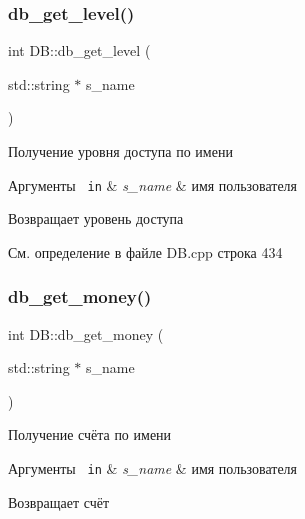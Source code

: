 \mbox{\label{group__dbcpp_ga7792fdc9d2dc66bfa5ba84aa9db1ee8b}} 
\subsubsection{\texorpdfstring{db\_get\_level()}{db\_get\_level()}}
{\footnotesize\ttfamily int D\+B\+::db\+\_\+get\+\_\+level (\begin{DoxyParamCaption}\item[{std\+::string $\ast$}]{s\+\_\+name }\end{DoxyParamCaption})}



Получение уровня доступа по имени 


\begin{DoxyParams}[1]{Аргументы}
\mbox{\texttt{ in}}  & {\em s\+\_\+name} & имя пользователя \\
\hline
\end{DoxyParams}
\begin{DoxyReturn}{Возвращает}
уровень доступа 
\end{DoxyReturn}


См. определение в файле D\+B.\+cpp строка 434

\mbox{\label{group__dbcpp_ga004b212ee48936251ff24b9f70d67dd0}} 
\subsubsection{\texorpdfstring{db\_get\_money()}{db\_get\_money()}}
{\footnotesize\ttfamily int D\+B\+::db\+\_\+get\+\_\+money (\begin{DoxyParamCaption}\item[{std\+::string $\ast$}]{s\+\_\+name }\end{DoxyParamCaption})}



Получение счёта по имени 


\begin{DoxyParams}[1]{Аргументы}
\mbox{\texttt{ in}}  & {\em s\+\_\+name} & имя пользователя \\
\hline
\end{DoxyParams}
\begin{DoxyReturn}{Возвращает}
счёт 
\end{DoxyReturn}


